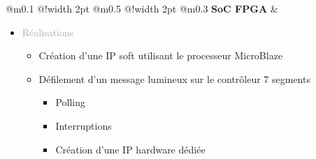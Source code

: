 \documentclass{article}
\begin{document}
\thispagestyle{student_lab_work_ENSEA}

\vspace*{0cm}

\vfill %



\begin{tabular}
    {
        @{}m{}
        @{\hspace{0.001\textwidth}}!{\color{secondaryBlue}\vline width 2pt} %
        @{}m{0.5\textwidth}
        @{\hspace{0.025\textwidth}}!{\color{secondaryBlue}\vline width 2pt} %
        @{{\hspace{0.001\textwidth}}}m{0.3\textwidth}
    }
    \textcolor{secondaryBlue}
    {
        \textbf{SoC FPGA}
    } 
    &
    \begin{itemize}
        [label={}, topsep=8pt, partopsep=0pt, itemsep=0.5pt, parsep=2pt,after=\vspace*{-\baselineskip}]
        \setlength{\itemsep}{10pt}
        \item \textcolor{darkGray}{Réalisations}
        \begin{itemize}
        [label={\textcolor{gray!80}{\checkmark}}, topsep=8pt, partopsep=0pt, itemsep=0.5pt, parsep=2pt, after=\vspace*{-\baselineskip}] 

            \item \textcolor{gray!80}{Création d'une IP soft utilisant le processeur MicroBlaze}
            \item \textcolor{gray!80}{Défilement d'un message lumineux sur le contrôleur 7 segments}
            \begin{itemize}
                [label={\textcolor{gray!80}{$\triangleright$}}, topsep=0pt, partopsep=0pt, itemsep=0.5pt, parsep=2pt]
                \item \textcolor{gray!80}{Polling}
                \item \textcolor{gray!80}{Interruptions}
                \item \textcolor{gray!80}{Création d'une IP hardware dédiée}


\end{itemize}
\end{itemize}
\end{itemize}
\end{tabular}
\end{document}
